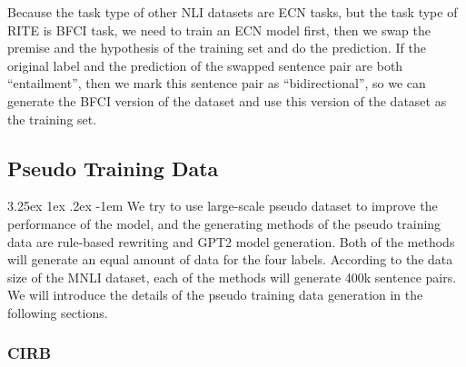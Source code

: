 \documentclass[12pt]{article}
\makeatletter
\renewcommand\paragraph{\@startsection{paragraph}{5}{\z@}%
  {3.25ex \@plus1ex \@minus.2ex}%
  {-1em}%
  {\normalfont\normalsize\bfseries}}
\makeatother
\begin{document}
\begin{CJK*}{UTF8}{bkai}
\begin{spacing}{1.77}
Because the task type of other NLI datasets are ECN tasks, but the task type of RITE is BFCI task, we need to train an ECN model first, then we swap the premise and the hypothesis of the training set and do the prediction. If the original label and the prediction of the swapped sentence pair are both ``entailment'', then we mark this sentence pair as ``bidirectional'', so we can generate the BFCI version of the dataset and use this version of the dataset as the training set.

\subsection{Pseudo Training Data}
\paragraph{}
We try to use large-scale pseudo dataset to improve the performance of the model, and the generating methods of the pseudo training data are rule-based rewriting and GPT2 model generation. Both of the methods will generate an equal amount of data for the four labels. According to the data size of the MNLI dataset, each of the methods will generate 400k sentence pairs. We will introduce the details of the pseudo training data generation in the following sections.


\subsubsection{CIRB}

\end{spacing}
\end{CJK*}
\end{document}
